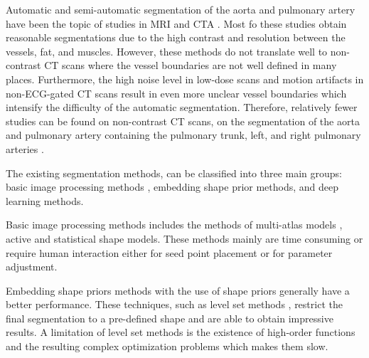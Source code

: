 Automatic and semi-automatic segmentation of the aorta and pulmonary artery have been the topic of studies in MRI \cite{berhane2020fully} and \gls{CTA} \cite{ecabert2011segmentation, biesdorf2012segmentation, entezari2013analysis, gao2016automatic, gao2017quantification, cao2019fully, linguraru2010segmentation, moses2016automatic, roman20183d,baskaran2020automatic}. Most fo these studies obtain reasonable segmentations due to the high contrast and resolution between the vessels, fat, and muscles. However, these methods do not translate well to non-contrast \gls{CT} scans where the vessel boundaries are not well defined in many places. Furthermore, the high noise level in low-dose scans and motion artifacts in non-\gls{ECG}-gated \gls{CT} scans result in even more unclear vessel boundaries which intensify the difficulty of the automatic segmentation. Therefore, relatively fewer studies can be found on non-contrast \gls{CT} scans, on the segmentation of the aorta \cite{ isgum2009multi,avila2013segmentation, dasgupta2017morphological, tahoces2019automatic, kitasaka2002automated, feuerstein2009automated, xie2014automated, kurugol2015automated,  noothout2018automatic,tahoces2019automatic,trullo2017joint, he2020multi} and pulmonary artery containing the pulmonary trunk, left, and right pulmonary arteries \cite{feuerstein2010adaptive, xie2015automated,bruns2019cnn}.

The existing segmentation methods, can be classified into three main groups: basic image processing methods \cite{isgum2009multi, avila2013segmentation, dasgupta2017morphological,tahoces2019automatic, }, embedding shape prior methods\cite{feuerstein2009automated, feuerstein2010adaptive, kitasaka2002automated, xie2014automated, xie2015automated, kurugol2015automated}, and deep learning methods\cite{trullo2017joint, he2020multi, noothout2018automatic, bruns2019cnn}.

Basic image processing methods includes the methods of multi-atlas models \cite{isgum2009multi}, active \cite{dasgupta2017morphological} and statistical shape models. These methods mainly are time consuming or require human interaction either for seed point placement or for parameter adjustment. 


Embedding shape priors methods with the use of shape priors generally have a better performance. These techniques, such as level set methods \cite{kurugol2015automated}, restrict the final segmentation to a pre-defined shape and are able to obtain impressive results. A limitation of level set methods is the existence of high-order functions and the resulting complex optimization problems which makes them slow. 



